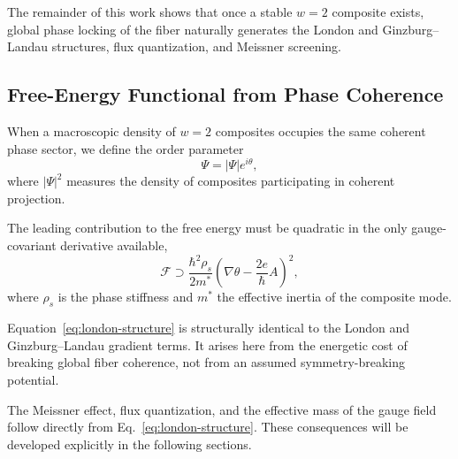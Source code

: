     The remainder of this work shows that
    once a stable $w=2$ composite exists,
    global phase locking of the fiber
    naturally generates the London and Ginzburg--Landau structures,
    flux quantization, and Meissner screening.

  \subsection{Free-Energy Functional from Phase Coherence}
    \label{subsec:free-energy-functional}

    When a macroscopic density of $w=2$ composites
    occupies the same coherent phase sector,
    we define the order parameter
    \begin{equation}
      \Psi = |\Psi| e^{i\theta} ,
    \end{equation}
    where $|\Psi|^2$ measures the density of composites
    participating in coherent projection.

    The leading contribution to the free energy
    must be quadratic in the only gauge-covariant derivative available,
    \begin{equation}
      \mathcal{F}
      \supset
      \frac{\hbar^2 \rho_s}{2 m^*}
      \left(
        \nabla \theta - \frac{2e}{\hbar} A
      \right)^2 ,
      \label{eq:london-structure}
    \end{equation}
    where $\rho_s$ is the phase stiffness
    and $m^*$ the effective inertia of the composite mode.

    Equation~\ref{eq:london-structure}
    is structurally identical to the London
    and Ginzburg--Landau gradient terms.
    It arises here from the energetic cost
    of breaking global fiber coherence,
    not from an assumed symmetry-breaking potential.

    The Meissner effect, flux quantization,
    and the effective mass of the gauge field
    follow directly from Eq.~\ref{eq:london-structure}.
    These consequences will be developed explicitly
    in the following sections.
